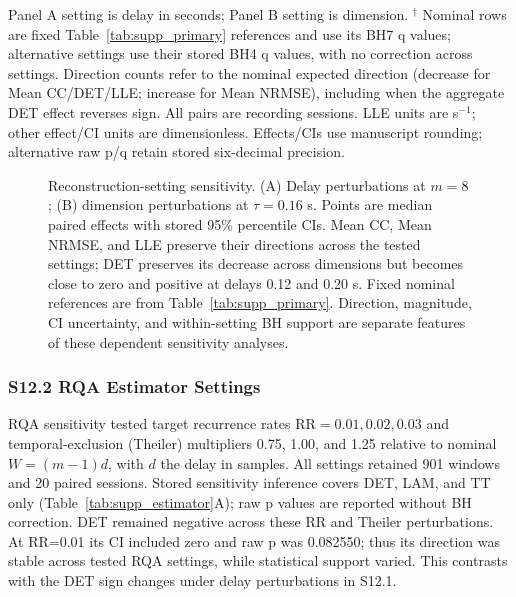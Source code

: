 \begin{table}[p]
{}
\par\medskip
\begin{minipage}{\textwidth}\footnotesize
Panel A setting is delay in seconds; Panel B setting is dimension. $^{\dagger}$ Nominal rows are fixed Table~\ref{tab:supp_primary} references and use its BH7 q values; alternative settings use their stored BH4 q values, with no correction across settings. Direction counts refer to the nominal expected direction (decrease for Mean CC/DET/LLE; increase for Mean NRMSE), including when the aggregate DET effect reverses sign. All pairs are recording sessions. LLE units are s$^{-1}$; other effect/CI units are dimensionless. Effects/CIs use manuscript rounding; alternative raw p/q retain stored six-decimal precision.
\end{minipage}
\end{table}
\begin{figure}[p]
\centering
{}
\caption{Reconstruction-setting sensitivity. (A) Delay perturbations at $m=8$; (B) dimension perturbations at $\tau=0.16$ s. Points are median paired effects with stored 95\% percentile CIs. Mean CC, Mean NRMSE, and LLE preserve their directions across the tested settings; DET preserves its decrease across dimensions but becomes close to zero and positive at delays 0.12 and 0.20 s. Fixed nominal references are from Table~\ref{tab:supp_primary}. Direction, magnitude, CI uncertainty, and within-setting BH support are separate features of these dependent sensitivity analyses.}
\label{fig:supp_reconstruction}
\end{figure}
\subsubsection*{S12.2 RQA Estimator Settings}
RQA sensitivity tested target recurrence rates $\mathrm{RR}=0.01,0.02,0.03$ and temporal-exclusion (Theiler) multipliers 0.75, 1.00, and 1.25 relative to nominal $W=(m-1)d$, with $d$ the delay in samples. All settings retained 901 windows and 20 paired sessions. Stored sensitivity inference covers DET, LAM, and TT only (Table~\ref{tab:supp_estimator}A); raw p values are reported without BH correction. DET remained negative across these RR and Theiler perturbations. At RR=0.01 its CI included zero and raw p was 0.082550; thus its direction was stable across tested RQA settings, while statistical support varied. This contrasts with the DET sign changes under delay perturbations in S12.1.

